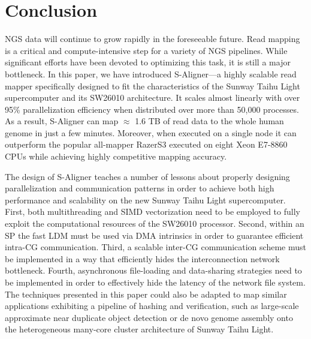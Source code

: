 \documentclass[conference]{IEEEtran}
\begin{document}
\section{Conclusion}
\label{Conclusion}

NGS data will continue to grow rapidly in the foreseeable future. Read
mapping is a critical and compute-intensive step for a variety of NGS
pipelines. While significant efforts have been devoted to optimizing
this task, it is still a major bottleneck. In this paper, we have
introduced S-Aligner---a highly scalable read mapper specifically
designed to fit the characteristics of the Sunway Taihu Light
supercomputer and its SW26010 architecture.  It scales almost linearly
with over 95\% parallelization efficiency when distributed over more
than 50,000 processes. As a result, S-Aligner can map $\approx$ 1.6 TB
of read data to the whole human genome in just a few
minutes. Moreover, when executed on a single node it can outperform
the popular all-mapper RazerS3 executed on eight Xeon E7-8860 CPUs
while achieving highly competitive mapping accuracy.

The design of S-Aligner teaches a number of lessons about properly
designing parallelization and communication patterns in order to
achieve both high performance and scalability on the new Sunway Taihu
Light supercomputer. First, both multithreading and SIMD vectorization
need to be employed to fully exploit the computational resources of
the SW26010 processor. Second, within an SP the fast LDM must be used
via DMA intrinsics in order to guarantee efficient intra-CG
communication. Third, a scalable inter-CG communication scheme must be
implemented in a way that efficiently hides the interconnection
network bottleneck. Fourth, asynchronous file-loading and data-sharing
strategies need to be implemented in order to effectively hide the
latency of the network file system. The techniques presented in this
paper could also be adapted to map similar applications exhibiting a
pipeline of hashing and verification, such as large-scale approximate
near duplicate object detection \cite{efficient} or de novo genome
assembly \cite{swap} onto the heterogeneous many-core cluster
architecture of Sunway Taihu Light.



\end{document}

